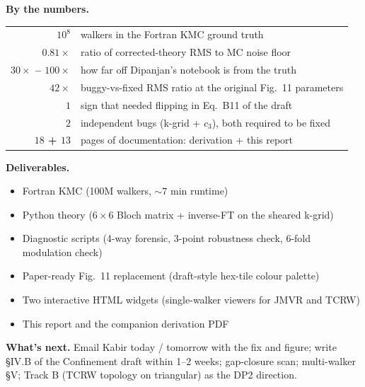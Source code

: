 \documentclass[11pt,a4paper]{article}
\begin{document}
\vspace{2mm}
\noindent \textbf{By the numbers.}
\begin{center}
\begin{tabular}{rl}
\textbf{$10^8$}    & walkers in the Fortran KMC ground truth \\
\textbf{$0.81 \times$} & ratio of corrected-theory RMS to MC noise floor \\
\textbf{$30 \times$ -- $100\times$} & how far off Dipanjan's notebook is from the truth \\
\textbf{$42 \times$} & buggy-vs-fixed RMS ratio at the original Fig.~11 parameters \\
\textbf{$1$} & sign that needed flipping in Eq.~B11 of the draft \\
\textbf{$2$} & independent bugs (k-grid + $c_3$), both required to be fixed \\
\textbf{$18$ + $13$} & pages of documentation: derivation + this report
\end{tabular}
\end{center}

\vspace{4mm}
\noindent\textbf{Deliverables.}
\begin{itemize}[leftmargin=*, noitemsep]
\item Fortran KMC (100M walkers, $\sim 7$ min runtime)
\item Python theory ($6\times 6$ Bloch matrix + inverse-FT on the sheared k-grid)
\item Diagnostic scripts (4-way forensic, 3-point robustness check, 6-fold modulation check)
\item Paper-ready Fig.~11 replacement (draft-style hex-tile colour palette)
\item Two interactive HTML widgets (single-walker viewers for JMVR and TCRW)
\item This report and the companion derivation PDF
\end{itemize}

\vspace{4mm}
\noindent\textbf{What's next.} Email Kabir today / tomorrow with the
fix and figure; write §IV.B of the Confinement draft within
1--2 weeks; gap-closure scan; multi-walker §V; Track B (TCRW topology
on triangular) as the DP2 direction.

\newpage
\setcounter{page}{1}

\tableofcontents
\vspace{1cm}

\end{document}

